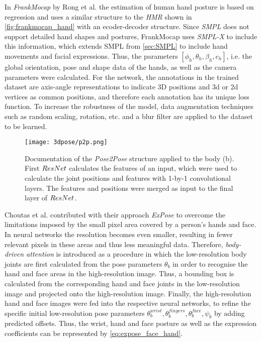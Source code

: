 In \emph{FrankMocap} by Rong et al. \cite{frankmocap} the estimation of human hand posture is based on regression and uses a similar structure to the \emph{HMR} shown in \autoref{fig:frankmocap_hand} with an ecoder-decoder structure. Since \emph{SMPL} does not support detailed hand shapes and postures, FrankMocap uses \emph{SMPL-X} to include this information, which extends SMPL from \autoref{sec:SMPL} to include hand movements and facial expressions. Thus, the parameters $[\phi_{h},\theta_{h},\beta_{h},c_{h}]$, i.e. the global orientation, pose and shape data of the hands, as well as the camera parameters were calculated. For the network, the annotations in the trained dataset are axis-angle representations to indicate 3D positions and 3d or 2d vertices as common positions, and therefore each annotation has its unique loss function. To increase the robustness of the model, data augmentation techniques such as random scaling, rotation, etc. and a blur filter are applied to the dataset to be learned.

\begin{figure}[!h]
	\centering
	\texttt{[image: 3dpose/p2p.png]}
	\caption{Documentation of the \emph{Pose2Pose} structure applied to the body (b). First $\protect ResNet$ calculates the features of an input, which were used to calculate the joint positions and features with 1-by-1 convolutional layers. The features and positions were merged as input to the final layer of $\protect ResNet$.\cite{moon}}
	\label{fig:p2p}
\end{figure}

Choutas et al. \cite{expose} contributed with their approach \emph{ExPose} to overcome the limitations imposed by the small pixel area covered by a person's hands and face. In neural networks the resolution becomes even smaller, resulting in fewer relevant pixels in these areas and thus less meaningful data.
Therefore, \emph{body-driven attention} is introduced as a procedure in which the low-resolution body joints are first calculated from the pose parameters $\theta_{b}$ in order to recognise the hand and face areas in the high-resolution image. Thus, a bounding box is calculated from the corresponding hand and face joints in the low-resolution image and projected onto the high-resolution image. Finally, the high-resolution hand and face images were fed into the respective neural networks, to  refine the specific initial low-resolution pose parameters $\theta_{b}^{wrist}, \theta_{b}^{fingers}, \theta_{b}^{face}, \psi_{b}$ by adding predicted offsets. Thus, the wrist, hand and face posture as well as the expression coefficients can be represented by \autoref{eq:expose_face_hand}.

